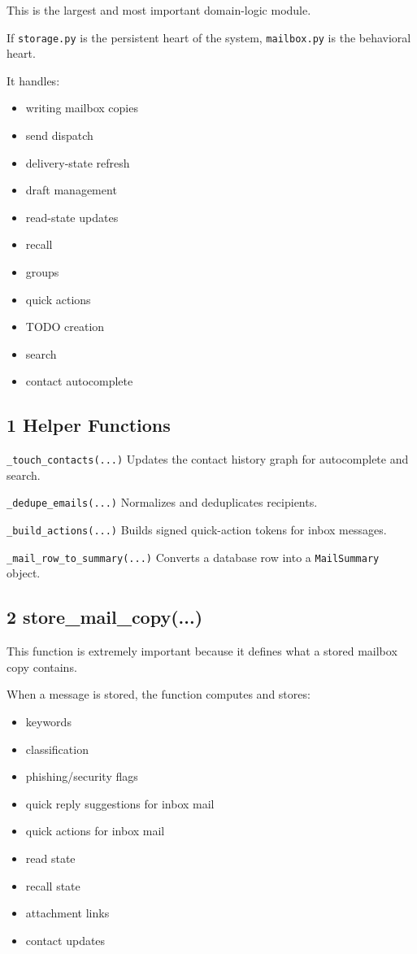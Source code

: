 \documentclass[11pt,a4paper]{article}
\begin{document}
This is the largest and most important domain-logic module.

If \nolinkurl{storage.py} is the persistent heart of the system, \nolinkurl{mailbox.py} is the behavioral heart.

It handles:

\begin{itemize}
\item writing mailbox copies
\item send dispatch
\item delivery-state refresh
\item draft management
\item read-state updates
\item recall
\item groups
\item quick actions
\item TODO creation
\item search
\item contact autocomplete
\end{itemize}

\subsection{1 Helper Functions}

\nolinkurl{_touch_contacts(...)} Updates the contact history graph for autocomplete and search.

\nolinkurl{_dedupe_emails(...)} Normalizes and deduplicates recipients.

\nolinkurl{_build_actions(...)} Builds signed quick-action tokens for inbox messages.

\nolinkurl{_mail_row_to_summary(...)} Converts a database row into a \nolinkurl{MailSummary} object.

\subsection{2 store\_mail\_copy(...)}

This function is extremely important because it defines what a stored mailbox copy contains.

When a message is stored, the function computes and stores:

\begin{itemize}
\item keywords
\item classification
\item phishing/security flags
\item quick reply suggestions for inbox mail
\item quick actions for inbox mail
\item read state
\item recall state
\item attachment links
\item contact updates
\end{itemize}
\end{document}
